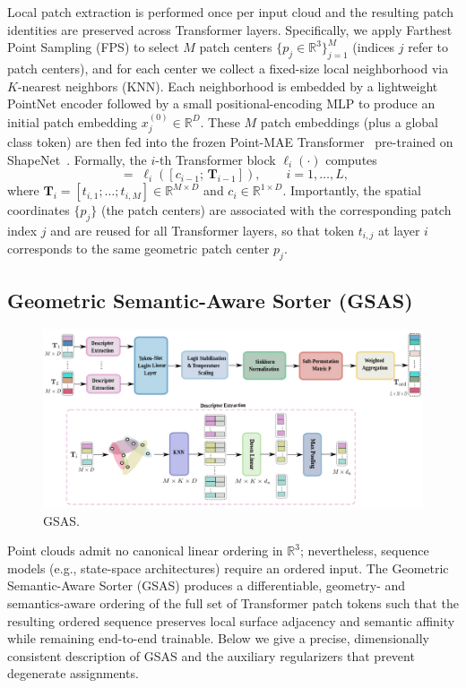Local patch extraction is performed once per input cloud and the resulting patch identities are preserved across Transformer layers. Specifically, we apply Farthest Point Sampling (FPS) to select \(M\) patch centers \(\{p_j\in\mathbb{R}^3\}_{j=1}^M\) (indices \(j\) refer to patch centers), and for each center we collect a fixed-size local neighborhood via \(K\)-nearest neighbors (KNN). Each neighborhood is embedded by a lightweight PointNet encoder followed by a small positional-encoding MLP to produce an initial patch embedding \(x_j^{(0)}\in\mathbb{R}^D\). These \(M\) patch embeddings (plus a global class token) are then fed into the frozen Point-MAE Transformer~\cite{pang2022masked} pre-trained on ShapeNet~\cite{chang2015shapenet}. Formally, the \(i\)-th Transformer block \(\ell_i(\cdot)\) computes
\begin{equation}
[c_i;\,\mathbf{T}_i] \;=\; \ell_i([c_{i-1};\,\mathbf{T}_{i-1}]), \qquad i=1,\dots,L,
\end{equation}
where \(\mathbf{T}_i = [t_{i,1};\dots;t_{i,M}]\in\mathbb{R}^{M\times D}\) and \(c_i\in\mathbb{R}^{1\times D}\). Importantly, the spatial coordinates \(\{p_j\}\) (the patch centers) are associated with the corresponding patch index \(j\) and are reused for all Transformer layers, so that token \(t_{i,j}\) at layer \(i\) corresponds to the same geometric patch center \(p_j\).

\subsection{Geometric Semantic-Aware Sorter (GSAS)}
\label{sec:gsas}

\begin{figure}[h!]
  \centering 
    \includegraphics[width=0.98\linewidth]{figs/GSAS}
  \caption{GSAS.}
  \label{fig:GSAS}
\end{figure}

Point clouds admit no canonical linear ordering in \(\mathbb{R}^3\); nevertheless, sequence models (e.g., state-space architectures) require an ordered input. The Geometric Semantic-Aware Sorter (GSAS) produces a differentiable, geometry- and semantics-aware ordering of the full set of Transformer patch tokens such that the resulting ordered sequence preserves local surface adjacency and semantic affinity while remaining end-to-end trainable. Below we give a precise, dimensionally consistent description of GSAS and the auxiliary regularizers that prevent degenerate assignments.

